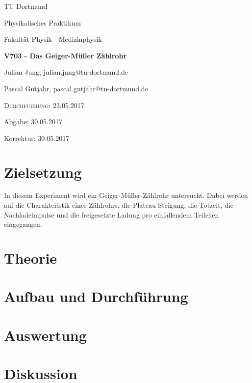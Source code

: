 

  
  \begin{titlepage}
    \centering
    {\LARGE TU Dortmund \par}
    \vspace{0.75cm}
    {\Large Physikalisches Praktikum \par}
    \vspace{0.75cm}
    {\Large Fakultät Physik - Medizinphysik \par}
    \vspace{4cm}
    {\LARGE \bfseries V703 - Das Geiger-Müller Zählrohr \par}
    \vspace{4cm}
    {\large Julian Jung, julian.jung@tu-dortmund.de \par \vspace{0.25cm}
    Pascal Gutjahr, pascal.gutjahr@tu-dortmund.de \par}
    \vspace{6cm}
    {\scshape Durchführung: 23.05.2017 \par \vspace{0.25cm}
    Abgabe: 30.05.2017 \par \vspace{0.25cm}
    Korrektur: 30.05.2017}
  \end{titlepage}
\newpage
\tableofcontents
\newpage
\section{Zielsetzung}
In diesem Experiment wird ein Geiger-Müller-Zählrohr untersucht. Dabei werden auf
die Charakteristik eines Zählrohrs, die Plateau-Steigung, die Totzeit, die
Nachladeimpulse und die freigesetzte Ladung pro einfallendem Teilchen eingegangen.
\section{Theorie}
 
\section{Aufbau und Durchführung}
 
\section{Auswertung}
 
\section{Diskussion}

\printbibliography

